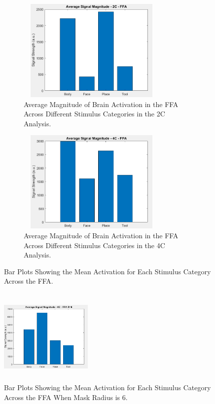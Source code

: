 \begin{figure}[htbp]
 	\centering
	\begin{subfigure}{0.49\textwidth}
		\centering
		\includegraphics[width = 0.8\textwidth, height = 5cm]{assets/images/upa_2C_ffa.png}
		\caption{Average Magnitude of Brain Activation in the \gls{FFA} Across Different Stimulus Categories in the \gls{2C} Analysis.}
		\label{fig:upa_ffa_2C}
	\end{subfigure}
	\hfill
	\begin{subfigure}{0.49\textwidth}
		\centering
	 	\includegraphics[width = 0.8\textwidth, height = 5cm]{assets/images/upa_4C_ffa.png}
		\caption{Average Magnitude of Brain Activation in the \gls{FFA} Across Different Stimulus Categories in the \gls{4C} Analysis.}
		\label{fig:upa_ffa_4C}
	\end{subfigure}
	\caption[Activation Magnitude Per Stimulus Category \textit{(UPA)} Bar Plots for the FFA]{Bar Plots Showing the Mean Activation for Each Stimulus Category Across the \gls{FFA}.}
 	\label{fig:upa_ffa}
\end{figure}

\vspace{2pt}

\begin{figure}
    \centering
    \includegraphics[width = 0.4\textwidth, height = 4.7cm]{assets/images/upa_4C_ffa_6.png}
    \caption[Activation Magnitude Per Stimulus Category \textit{(UPA)} Bar Plots for the FFA Centrally]{Bar Plots Showing the Mean Activation for Each Stimulus Category Across the \gls{FFA} When Mask Radius is 6.}
    \label{fig:upa_ffa_6}
\end{figure}


